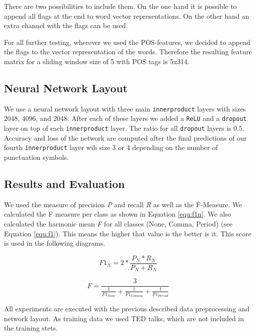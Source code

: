 There are two possibilities to include them.
On the one hand it is possible to append all flags at the end to word vector representations.
On the other hand an extra channel with the flags can be used.

For all further testing, wherever we used the POS-features, we decided to append the flags to the vector representation of the words.
Therefore the resulting feature matrix for a sliding window size of 5 with POS tags is 5x314.



\subsection{Neural Network Layout}

We use a neural network layout with three main \texttt{innerproduct} layers with sizes 2048, 4096, and 2048.
After each of these layers we added a \texttt{ReLU} and a \texttt{dropout} layer on top of each \texttt{innerproduct} layer.
The ratio for all \texttt{dropout} layers is $0.5$.
Accuracy and loss of the network are computed after the final predictions of our fourth \texttt{innerproduct} layer wih size 3 or 4 depending on the number of punctuation symbols.

\subsection{Results and Evaluation}

We used the measure of precision \emph{P} and recall \emph{R} as well as the F-Measure. We calculated the F measure per class as shown in Equation \ref{equ:f1n}.
We also calculated the harmonic mean \emph{F} for all classes (None, Comma, Period) (see Equation \ref{equ:f1}). This means the higher that value is the better is it. This score is used in the following diagrams.

\begin{equation}
\label{equ:f1n}
F1_{N} = 2 * \frac{P_{N}* R_{N}}{P_{N}+R_{N}}
\end{equation}

\begin{equation}
\label{equ:f1}
F = \frac{3}{\frac{1}{F1_{None}} + \frac{1}{F1_{Comma}} + \frac{1}{F1_{Period}}}
\end{equation}

All experiments are executed with the previous described data preprocessing and network layout.
As training data we used TED talks, which are not included in the training stets.

